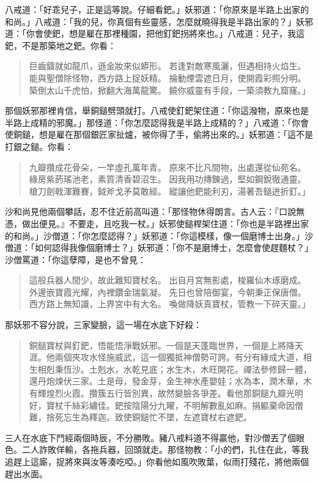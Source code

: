 八戒道：「好乖兒子，正是這等說。仔細看鈀。」妖邪道：「你原來是半路上出家的和尚。」八戒道：「我的兒，你真個有些靈感，怎麼就曉得我是半路出家的？」妖邪道：「你會使鈀，想是雇在那裡種園，把他釘鈀拐將來也。」八戒道：兒子，我這鈀，不是那築地之鈀。你看：
\begin{quote}
巨齒鑄就如龍爪，遜金妝來似蟒形。
若逢對敵寒風灑，但遇相持火焰生。
能與聖僧除怪物，西方路上捉妖精。
掄動煙雲遮日月，使開霞彩照分明。
築倒太山千虎怕，掀翻大海萬龍驚。
饒你威靈有手段，一築須教九窟窿。」
\end{quote}

那個妖邪那裡肯信，舉銅鎚劈頭就打。八戒使釘鈀架住道：「你這潑物，原來也是半路上成精的邪魔。」那怪道：「你怎麼認得我是半路上成精的？」八戒道：「你會使銅鎚，想是雇在那個銀匠家扯爐，被你得了手，偷將出來的。」妖邪道：「這不是打銀之鎚。你看：
\begin{quote}
九瓣攢成花骨朵，一竿虛孔萬年青。
原來不比凡間物，出處還從仙苑名。
綠房紫菂瑤池老，素質清香碧沼生。
因我用功摶鍊過，堅如鋼銳徹通靈。
槍刀劍戟渾難賽，鉞斧戈矛莫敢經。
縱讓他鈀能利刃，湯著吾鎚迸折釘。」
\end{quote}

沙和尚見他兩個攀話，忍不住近前高叫道：「那怪物休得朗言。古人云：『口說無憑，做出便見。』不要走，且吃我一杖。」妖邪使鎚桿架住道：「你也是半路裡出家的和尚。」沙僧道：「你怎麼認得？」妖邪道：「你這模樣，像一個磨博士出身。」沙僧道：「如何認得我像個磨博士？」妖邪道：「你不是磨博士，怎麼會使趕麵杖？」沙僧罵道：「你這孽障，是也不曾見：
\begin{quote}
這般兵器人間少，故此難知寶杖名。
出自月宮無影處，梭羅仙木琢磨成。
外邊嵌寶霞光耀，內裡鑽金瑞氣凝。
先日也曾陪御宴，今朝秉正保唐僧。
西方路上無知識，上界宮中有大名。
喚做降妖真寶杖，管教一下碎天靈。」
\end{quote}

那妖邪不容分說，三家變臉，這一場在水底下好殺：
\begin{quote}
銅鎚寶杖與釘鈀，悟能悟淨戰妖邪。一個是天蓬臨世界，一個是上將降天涯。他兩個夾攻水怪施威武，這一個獨抵神僧勢可誇。有分有緣成大道，相生相剋秉恆沙。土剋水，水乾見底；水生木，木旺開花。禪法參修歸一體，還丹炮煉伏三家。土是母，發金芽，金生神水產嬰娃；水為本，潤木華，木有輝煌烈火霞。攢簇五行皆別異，故然變臉各爭差。看他那銅鎚九瓣光明好，寶杖千絲彩繡佳。鈀按陰陽分九曜，不明解數亂如麻。捐軀棄命因僧難，捨死忘生為釋迦。致使銅鎚忙不墜，左遮寶杖右遮鈀。
\end{quote}

三人在水底下鬥經兩個時辰，不分勝敗。豬八戒料道不得贏他，對沙僧丟了個眼色。二人詐敗佯輸，各拖兵器，回頭就走。那怪物教：「小的們，扎住在此，等我追趕上這廝，捉將來與汝等湊吃啞。」你看他如風吹敗葉，似雨打殘花，將他兩個趕出水面。


